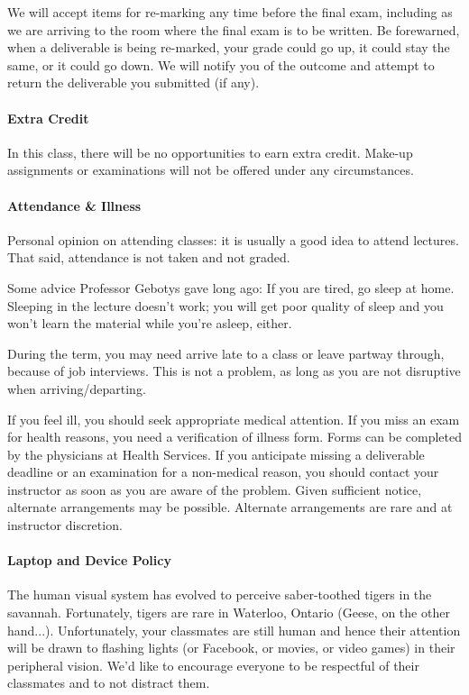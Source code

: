 \documentclass[letterpaper,10pt]{article}
\begin{document}
We will accept items for re-marking any time before the final exam, including as we are arriving to the room where the final exam is to be written. Be forewarned, when a deliverable is being re-marked, your grade could go up, it could stay the same, or it could go down. We will notify you of the outcome and attempt to return the deliverable you submitted (if any).

\paragraph{Extra Credit}
In this class, there will be no opportunities to earn extra credit. Make-up assignments or examinations will not be offered under any circumstances.

\paragraph{Attendance \& Illness}

Personal opinion on attending classes: it is usually a good idea to attend lectures. That said, attendance is not taken and not graded.

Some advice Professor Gebotys gave long ago: If you are tired, go sleep at home. Sleeping in the lecture doesn't work; you will get poor quality of sleep and you won't learn the material while you're asleep, either.

During the term, you may need arrive late to a class or leave partway through, because of job interviews. This is not a problem, as long as you are not disruptive when arriving/departing.

If you feel ill, you should seek appropriate medical attention. If you miss an exam for health reasons, you need a verification of illness form. Forms can be completed by the physicians at Health Services. If you anticipate missing a deliverable deadline or an examination for a non-medical reason, you should contact your instructor as soon as you are aware of the problem. Given sufficient notice, alternate arrangements may be possible. Alternate arrangements are rare and at instructor discretion.

\paragraph{Laptop and Device Policy}
The human visual system has evolved to perceive saber-toothed tigers
in the savannah. Fortunately, tigers are rare in Waterloo, Ontario
(Geese, on the other hand...).
Unfortunately, your classmates are still human and hence their
attention will be drawn to flashing lights (or Facebook, or movies, or
video games) in their peripheral vision. We'd like to encourage
everyone to be respectful of their classmates and to not distract them.
\end{document}
